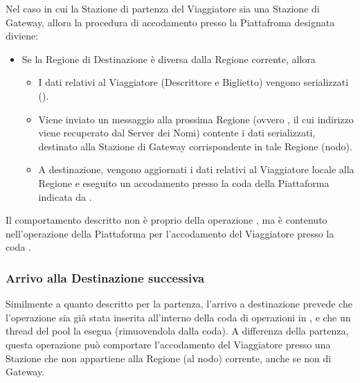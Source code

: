 	Nel caso in cui la Stazione di partenza del Viaggiatore sia una Stazione di Gateway, allora la procedura di accodamento presso la Piattafroma designata diviene:
	\begin{itemize}
		\item Se la Regione di Destinazione  è diversa dalla Regione corrente, allora
			\begin{itemize}
				\item I dati relativi al Viaggiatore (Descrittore e Biglietto) vengono serializzati ().
				\item Viene inviato un messaggio alla prossima Regione (ovvero , il cui indirizzo viene recuperato dal Server dei Nomi) contente i dati serializzati, destinato alla Stazione di Gateway corrispondente in tale Regione (nodo).
				\item A destinazione, vengono aggiornati i dati relativi al Viaggiatore locale alla Regione e eseguito un accodamento presso la coda  della Piattaforma indicata da .
			\end{itemize}
	\end{itemize}
	
	Il comportamento descritto non è proprio della operazione , ma è contenuto nell'operazione della Piattaforma per l'accodamento del Viaggiatore presso la coda . 
	
	
	\subsubsection{Arrivo alla Destinazione successiva}
		
	Similmente a quanto descritto per la partenza, l'arrivo a destinazione prevede che l'operazione  sia già stata inserita all'interno della coda di operazioni in , e che un thread del pool la esegua (rimuovendola dalla coda). A differenza della partenza, questa operazione può comportare l'accodamento del Viaggiatore presso una Stazione che non appartiene alla Regione (al nodo) corrente, anche se non di Gateway. 
	
